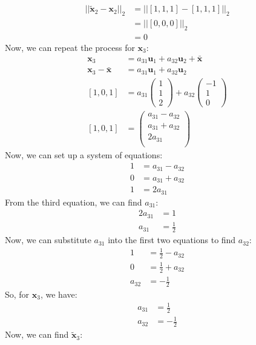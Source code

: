 \documentclass[a3paper,12pt]{extarticle} %
\begin{document}
\begin{enumerate}
\begin{align}
||\tilde{\mathbf{x}}_2 - \mathbf{x}_2||_2 &= ||[1, 1, 1] - [1, 1, 1]||_2\\
&= ||[0, 0, 0]||_2\\
&= 0
\end{align}
Now, we can repeat the process for $\mathbf{x}_3$:
\begin{align}
\mathbf{x}_3 &= a_{31}\mathbf{u}_1 + a_{32}\mathbf{u}_2 + \bar{\mathbf{x}}\\
\mathbf{x}_3 - \bar{\mathbf{x}} &= a_{31}\mathbf{u}_1 + a_{32}\mathbf{u}_2\\
[1, 0, 1] &= a_{31}\begin{pmatrix}
1\\
1\\
2
\end{pmatrix} + a_{32}\begin{pmatrix}
-1\\
1\\
0
\end{pmatrix}\\
[1, 0, 1] &= \begin{pmatrix}
a_{31} - a_{32}\\
a_{31} + a_{32}\\
2a_{31}\\
\end{pmatrix}
\end{align}
Now, we can set up a system of equations:
\begin{align}
1 &= a_{31} - a_{32}\\
0 &= a_{31} + a_{32}\\
1 &= 2a_{31}
\end{align}
From the third equation, we can find $a_{31}$:
\begin{align}
2a_{31} &= 1\\
a_{31} &= \frac{1}{2}
\end{align}
Now, we can substitute $a_{31}$ into the first two equations to find $a_{32}$:
\begin{align}
1 &= \frac{1}{2} - a_{32}\\
0 &= \frac{1}{2} + a_{32}\\
a_{32} &= -\frac{1}{2}
\end{align}
So, for $\mathbf{x}_3$, we have:
\begin{align}
a_{31} &= \frac{1}{2}\\
a_{32} &= -\frac{1}{2}
\end{align}
Now, we can find $\tilde{\mathbf{x}}_3$:
\begin{align}

\end{align}
\end{enumerate}
\end{document}

